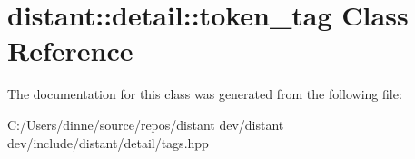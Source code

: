 \hypertarget{classdistant_1_1detail_1_1token__tag}{}\section{distant\+:\+:detail\+:\+:token\+\_\+tag Class Reference}
\label{classdistant_1_1detail_1_1token__tag}


The documentation for this class was generated from the following file\+:\begin{DoxyCompactItemize}
\item 
C\+:/\+Users/dinne/source/repos/distant dev/distant dev/include/distant/detail/tags.\+hpp\end{DoxyCompactItemize}
